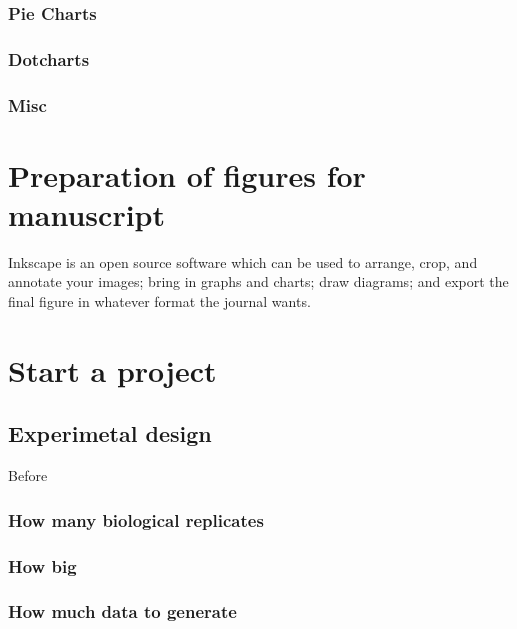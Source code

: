 \documentclass[]{book}
\theoremstyle{definition}
\theoremstyle{definition}
\theoremstyle{definition}
\theoremstyle{remark}
\begin{document}
\subsection{Pie Charts}\label{pie-charts}

\subsection{Dotcharts}\label{dotcharts}

\subsection{Misc}\label{misc}

\chapter{Preparation of figures for
manuscript}\label{preparation-of-figures-for-manuscript}

Inkscape is an open source software which can be used to arrange, crop,
and annotate your images; bring in graphs and charts; draw diagrams; and
export the final figure in whatever format the journal wants.

\section{}\label{section-2}

\chapter{Start a project}\label{start-a-project}

\section{Experimetal design}\label{experimetal-design}

Before

\subsection{How many biological
replicates}\label{how-many-biological-replicates}

\subsection{How big}\label{how-big}

\subsection{How much data to generate}\label{how-much-data-to-generate}
\end{document}
